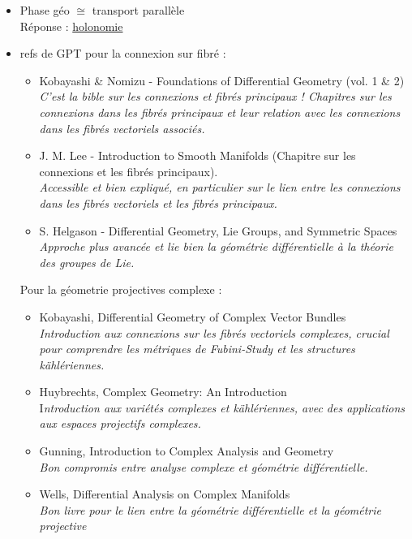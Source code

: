 \begin{itemize}
	\item Phase géo $\cong$ transport parallèle
	\\ Réponse :
	\href{https://fr.wikipedia.org/wiki/Holonomie}{holonomie}
	
	\item refs de GPT pour la connexion sur fibré :
	\begin{itemize}
		\item Kobayashi \& Nomizu - Foundations of Differential Geometry (vol. 1 \& 2)
		\\
		\textit{C'est la bible sur les connexions et fibrés principaux ! Chapitres sur les connexions dans les fibrés principaux et leur relation avec les connexions dans les fibrés vectoriels associés.}
		
		\item J. M. Lee - Introduction to Smooth Manifolds (Chapitre sur les connexions et les fibrés principaux).
		\\
		\textit{Accessible et bien expliqué, en particulier sur le lien entre les connexions dans les fibrés vectoriels et les fibrés principaux.}
		
		\item S. Helgason - Differential Geometry, Lie Groups, and Symmetric Spaces
		\\
		\textit{Approche plus avancée et lie bien la géométrie différentielle à la théorie des groupes de Lie.}
	\end{itemize}

	Pour la géometrie projectives complexe :
	\begin{itemize}
		\item Kobayashi, Differential Geometry of Complex Vector Bundles \\
		\textit{Introduction aux connexions sur les fibrés vectoriels complexes, crucial pour comprendre les métriques de Fubini-Study et les structures kählériennes.}
		
		\item Huybrechts, Complex Geometry: An Introduction \\
		I\textit{ntroduction aux variétés complexes et kählériennes, avec des applications aux espaces projectifs complexes.}
		
		\item Gunning, Introduction to Complex Analysis and Geometry \\
		\textit{Bon compromis entre analyse complexe et géométrie différentielle.}
		
		\item Wells, Differential Analysis on Complex Manifolds \\
		\textit{Bon livre pour le lien entre la géométrie différentielle et la géométrie projective}
		

\end{itemize}
\end{itemize}
